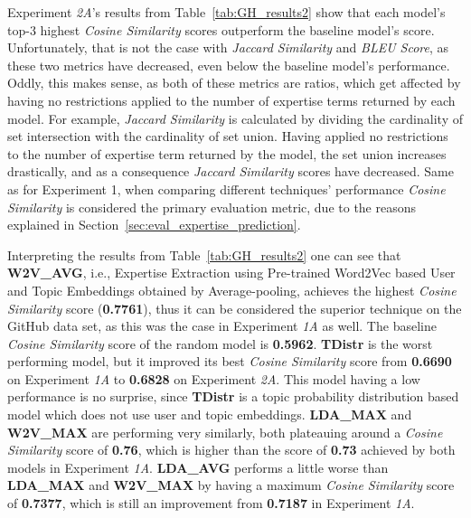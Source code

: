             Experiment \emph{2A}'s results from Table~\ref{tab:GH_results2} show that each model's top-$3$ highest \emph{Cosine Similarity} scores outperform the baseline model's score. Unfortunately, that is not the case with \emph{Jaccard Similarity} and \emph{BLEU Score}, as these two metrics have decreased, even below the baseline model's performance. Oddly, this makes sense, as both of these metrics are ratios, which get affected by having no restrictions applied to the number of expertise terms returned by each model. For example, \emph{Jaccard Similarity} is calculated by dividing the cardinality of set intersection with the cardinality of set union. Having applied no restrictions to the number of expertise term returned by the model, the set union increases drastically, and as a consequence \emph{Jaccard Similarity} scores have decreased. Same as for Experiment 1, when comparing different techniques' performance \emph{Cosine Similarity} is considered the primary evaluation metric, due to the reasons explained in Section~\ref{sec:eval_expertise_prediction}.
            
            Interpreting the results from Table~\ref{tab:GH_results2} one can see that \textbf{W2V\_AVG}, i.e.,  Expertise Extraction using Pre-trained Word2Vec based User and Topic Embeddings obtained by Average-pooling, achieves the highest \emph{Cosine Similarity} score (\textbf{0.7761}), thus it can be considered the superior technique on the GitHub data set, as this was the case in Experiment \emph{1A} as well. The baseline \emph{Cosine Similarity} score of the random model is \textbf{0.5962}. \textbf{TDistr} is the worst performing model, but it improved its best \emph{Cosine Similarity} score from \textbf{0.6690} on Experiment \emph{1A} to \textbf{0.6828} on Experiment \emph{2A}. This model having a low performance is no surprise, since \textbf{TDistr} is a topic probability distribution based model which does not use user and topic embeddings. \textbf{LDA\_MAX} and \textbf{W2V\_MAX} are performing very similarly, both plateauing around a \emph{Cosine Similarity} score of \textbf{0.76}, which is higher than the score of \textbf{0.73} achieved by both models in Experiment \emph{1A}. \textbf{LDA\_AVG} performs a little worse than \textbf{LDA\_MAX} and \textbf{W2V\_MAX} by having a maximum \emph{Cosine Similarity} score of \textbf{0.7377}, which is still an improvement from \textbf{0.7187} in Experiment \emph{1A}.
            
